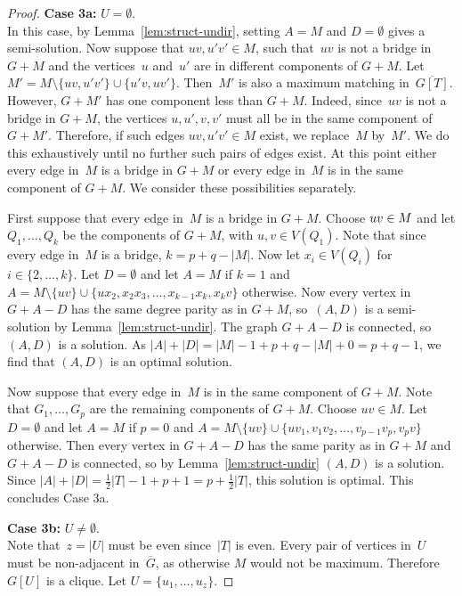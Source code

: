 \documentclass[11pt]{llncs}
\newcommand\displaycase[1]{{\bf #1}}
\begin{document}
\begin{proof}
\medskip
\noindent
\displaycase{Case 3a:} $U=\emptyset$.\\
In this case, by Lemma~\ref{lem:struct-undir}, setting $A=M$ and $D=\emptyset$
gives a semi-solution. Now suppose that $uv,u'v'\in M$, such that~$uv$ is not a
bridge in $G+M$ and the vertices~$u$ and~$u'$ are in different components of
$G+M$.  Let~$M'=M\setminus\{uv,u'v'\}\cup\{u'v,uv'\}$. Then~$M'$ is also a
maximum matching in~$\overline{G[T]}$. However, $G+M'$ has one component less
than $G+M$.  Indeed, since~$uv$ is not a bridge in $G+M$, the vertices
$u,u',v,v'$ must all be in the same component of $G+M'$. Therefore, if such
edges $uv,u'v'\in M$ exist, we replace~$M$ by~$M'$. We do this exhaustively
until no further such pairs of edges exist. At this point either every edge
in~$M$ is a bridge
in $G+M$
or every edge in~$M$ is in the same component of $G+M$.  We
consider these possibilities separately.

First suppose that every edge in~$M$ is a bridge
in $G+M$. 
Choose $uv \in\nobreak M$ and let
$Q_1,\ldots,Q_k$ be the components of $G+M$, with $u,v \in V(Q_1)$.  Note that
since every edge in~$M$ is a bridge, $k=p+q-|M|$. Now let $x_i \in V(Q_i)$ for
$i \in \{2,\ldots,k\}$. Let $D= \emptyset$ and let $A=M$ if $k=1$ and $A=M
\setminus \{uv\} \cup \{ux_2,x_2x_3,\ldots,x_{k-1}x_k,x_kv\}$ otherwise.  Now
every vertex in $G+A-D$ has the same degree parity as in $G+M$, so~$(A,D)$ is a
semi-solution by Lemma~\ref{lem:struct-undir}. The graph $G+A-D$ is connected,
so~$(A,D)$ is a solution. As  $|A|+|D|=|M|-1+p+q-|M|+0=p+q-1$, we find that $(A,D)$ is an optimal solution.

Now suppose that every edge in~$M$ is in the same component of $G+M$. Note that
$G_1,\ldots,G_p$ are the remaining components of $G+M$.  Choose $uv \in M$. Let
$D= \emptyset$ and let $A=M$ if $p=0$ and $A=M \setminus \{uv\} \cup
\{uv_1,v_1v_2,\ldots,v_{p-1}v_p,v_pv\}$ otherwise.  Then every vertex in
$G+A-D$ has the same parity as in $G+M$ and $G+A-D$ is connected, so by
Lemma~\ref{lem:struct-undir} $(A,D)$ is a solution. Since
$|A|+|D|=\frac{1}{2}|T|-1+p+1=p+\frac{1}{2}|T|$, this solution is optimal.
This concludes Case 3a.

\medskip
\noindent
\displaycase{Case 3b:} $U\neq\emptyset$.\\
Note that~$z=|U|$ must be even since~$|T|$ is even. Every pair of vertices
in~$U$ must be non-adjacent in~$\overline{G}$, as otherwise $M$ would not be
maximum. Therefore $G[U]$ is a
clique. Let $U=\{u_1,\ldots,u_z\}$.


\end{proof}
\end{document}
